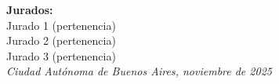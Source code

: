 \begin{titlepage}
\begin{flushright}
        {\fontsize{11pt}{15pt}\selectfont
        \textbf{Jurados:}} \\[0.5cm]
        {\fontsize{11pt}{15pt}\selectfont
        Jurado 1 (pertenencia)} \\
        {\fontsize{11pt}{15pt}\selectfont
        Jurado 2 (pertenencia)} \\
        {\fontsize{11pt}{15pt}\selectfont
        Jurado 3 (pertenencia)} \\[0.5cm]

        {\itshape\fontsize{10pt}{12pt}\selectfont
        Ciudad Autónoma de Buenos Aires, noviembre de 2025}
    \end{flushright}
\end{titlepage}
